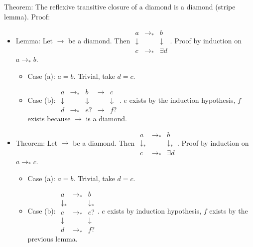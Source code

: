 Theorem: The reflexive transitive closure of a diamond is a diamond (stripe
lemma).
Proof:
\begin{itemize}
\item Lemma: Let $\to$ be a diamond. Then
$\begin{matrix}
a & \to_* & b \\
\downarrow & & \downarrow \\
c & \to_* & \exists d
  \end{matrix}$.
Proof by induction on $a \to_* b$.
\begin{itemize}
\item Case (a): $a = b$. Trivial, take $d=c$.
\item Case (b):
$\begin{matrix}
a & \to_* & b & \to & c\\
\downarrow & & \downarrow & & \downarrow\\
d & \to_* & e? & \to & f?
\end{matrix}$. $e$ exists by the induction hypothesis, $f$ exists because
$\to$ is a diamond.
\end{itemize}

\item Theorem:  Let $\to$ be a diamond. Then
$\begin{matrix}
a & \to_* & b \\
\downarrow_* & & \downarrow_* \\
c & \to_* & \exists d
  \end{matrix}$. Proof by induction on $a \to_* c$.
\begin{itemize}
\item Case (a): $a = b$. Trivial, take $d=c$.
\item Case (b):
$\begin{matrix}
a & \to_* & b\\
\downarrow_* & & \downarrow_* \\
c & \to_* & e?  \\
\downarrow & & \downarrow \\
d & \to_* & f?
\end{matrix}$. $e$ exists by induction hypothesis, $f$ exists by the previous lemma.
\end{itemize}
\end{itemize}
